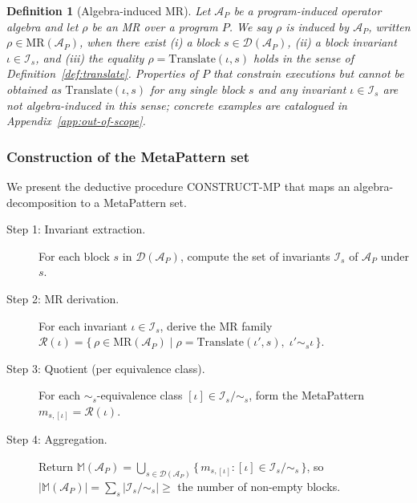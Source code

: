 \documentclass[manuscript]{acmart}
\newtheorem{definition}{Definition}
\begin{document}
\begin{definition}[Algebra-induced MR]
\label{def:alg-induced}
Let $\mathcal{A}_P$ be a program-induced operator algebra and let $\rho$ be an MR over a program $P$. We say $\rho$ is \emph{induced by $\mathcal{A}_P$}, written $\rho \in \mathrm{MR}(\mathcal{A}_P)$, when there exist (i) a block $s \in \mathcal{D}(\mathcal{A}_P)$, (ii) a block invariant $\iota \in \mathcal{I}_s$, and (iii) the equality $\rho = \mathrm{Translate}(\iota, s)$ holds in the sense of Definition~\ref{def:translate}. Properties of $P$ that constrain executions but cannot be obtained as $\mathrm{Translate}(\iota, s)$ for any single block $s$ and any invariant $\iota \in \mathcal{I}_s$ are \emph{not} algebra-induced in this sense; concrete examples are catalogued in Appendix~\ref{app:out-of-scope}.
\end{definition}

\subsubsection{Construction of the MetaPattern set}

We present the deductive procedure CONSTRUCT-MP that maps an algebra-decomposition to a MetaPattern set.

\begin{description}
  \item[Step 1: Invariant extraction.] For each block $s$ in $\mathcal{D}(\mathcal{A}_P)$, compute the set of invariants $\mathcal{I}_s$ of $\mathcal{A}_P$ under $s$.
  \item[Step 2: MR derivation.] For each invariant $\iota \in \mathcal{I}_s$, derive the MR family $\mathcal{R}(\iota) = \{\,\rho \in \mathrm{MR}(\mathcal{A}_P) \mid \rho = \mathrm{Translate}(\iota', s),\; \iota' \sim_s \iota\,\}$.
  \item[Step 3: Quotient (per equivalence class).] For each $\sim_s$-equivalence class $[\iota] \in \mathcal{I}_s/\sim_s$, form the MetaPattern $m_{s,[\iota]} = \mathcal{R}(\iota)$.
  \item[Step 4: Aggregation.] Return $\mathbb{M}(\mathcal{A}_P) = \bigcup_{s \in \mathcal{D}(\mathcal{A}_P)} \{\, m_{s,[\iota]} : [\iota] \in \mathcal{I}_s/\sim_s \,\}$, so $|\mathbb{M}(\mathcal{A}_P)| = \sum_s |\mathcal{I}_s/\sim_s| \ge $ the number of non-empty blocks.
\end{description}
\end{document}
